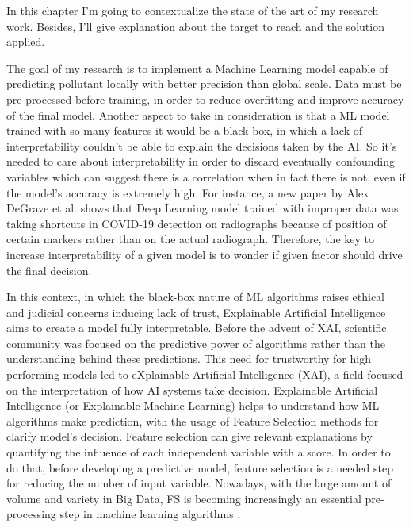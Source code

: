 In this chapter I'm going to contextualize the state of the art of my research work. 
Besides, I'll give explanation about the target to reach and the solution applied.\par
The goal of my research is to implement a Machine Learning model capable of predicting pollutant locally with better precision than global scale. 
Data must be pre-processed before training, in order to reduce overfitting and improve accuracy of the final model.\newline
Another aspect to take in consideration is that a ML model trained with so many features it would be a black box, in which a lack of interpretability couldn't be able to explain the decisions taken by the AI.
So it's needed to care about interpretability in order to discard eventually confounding variables  which can suggest there is a correlation when in fact there is not, even if the model's accuracy is extremely high. \newline
For instance, a new paper by Alex DeGrave et al.\cite{degrave2021ai} shows that Deep Learning model trained with improper data was taking shortcuts in COVID-19 detection on radiographs because of position of certain markers rather than on the actual radiograph.
Therefore, the key to increase interpretability of a given model is to wonder if given factor should drive the final decision.\par
In this context, in which the black-box nature of ML algorithms raises ethical and judicial concerns inducing lack of trust\cite{9141213}, Explainable Artificial Intelligence aims to create a model fully interpretable.
Before the advent of XAI, scientific community was focused on the predictive power of algorithms rather than the understanding behind these predictions.
This need for trustworthy for high performing models led to  eXplainable Artificial Intelligence (XAI), a field focused on the interpretation of how AI systems take decision.
Explainable Artificial Intelligence (or Explainable Machine Learning) helps to understand how ML algorithms make prediction, with the usage of Feature Selection methods for clarify model’s decision.
Feature selection can give relevant explanations by quantifying the influence of each independent variable with a score.
In order to do that, before developing a predictive model, feature selection is a needed step for reducing the number of input variable. \newline
Nowadays, with the large amount of volume and variety in Big Data, FS is becoming increasingly an essential pre-processing step in machine learning algorithms \cite{kamolov2021feature}.

